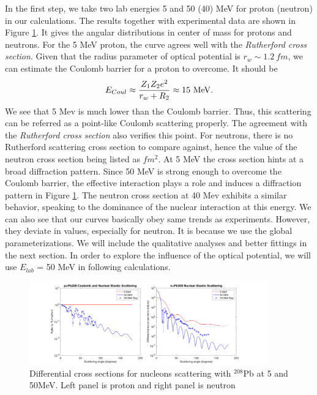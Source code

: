 	In the first step, we take two lab energies 5 and 50 (40) MeV for proton (neutron) in our calculations. The results together with experimental data are shown in Figure \ref{fig:angulardistribution}. It gives the angular distributions in center of mass for protons and neutrons. For the 5 MeV proton, the curve agrees well with the \emph{Rutherford cross section}. Given that the radius parameter of optical potential is $r_w\sim1.2\ fm$, we can estimate the Coulomb barrier for a proton to overcome. It should be 
	\begin{equation}
	E_{Coul}\approx\frac{Z_1Z_2e^2}{r_w+R_2}\approx15\ \rm{MeV}.
	\end{equation}
	We see that 5 Mev is much lower than the Coulomb barrier. Thus, this scattering can be referred as a point-like Coulomb scattering properly. The agreement with the \emph{Rutherford cross section} also verifies this point.
	For neutrons, there is no Rutherford scattering cross section to compare against, hence the value of the neutron cross section being listed as $fm^2$. At 5 MeV the cross section hints at a broad diffraction pattern.
	Since 50 MeV is strong enough to overcome the Coulomb barrier, the effective interaction plays a role and induces a diffraction pattern in Figure \ref{fig:angulardistribution}. The neutron cross section at 40 Mev exhibits a similar behavior, speaking to the dominance of the nuclear interaction at this energy. We can also see that our curves basically obey same trends as experiments. However, they deviate in values, especially for neutron. It is because we use the global parameterizations. We will include the qualitative analyses and better fittings in the next section. In order to explore the influence of the optical potential, we will use $E_{lab}$ = 50 MeV in following calculations.
	
	\begin{figure}[t]
	\centering
	\includegraphics[width=0.92\textwidth]{5.png}
	\caption{Differential cross sections for nucleons scattering with $^{208}$Pb at 5 and 50MeV. Left panel is proton and right panel is neutron  }
	\label{fig:angulardistribution}
	\end{figure}
	
